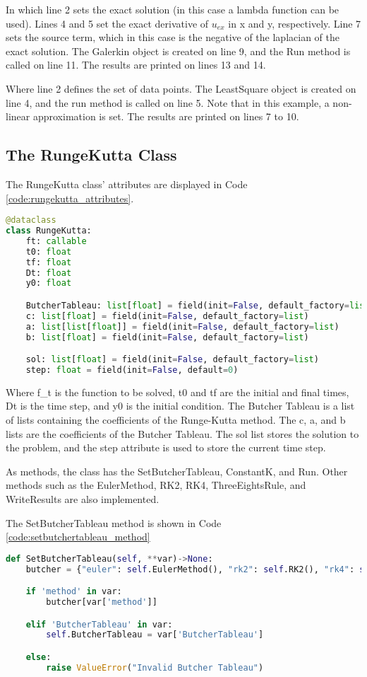 In which line 2 sets the exact solution (in this case a lambda function can be used). Lines 4 and 5 set the exact derivative of $u_{ex}$ in x and y, respectively. Line 7 sets the source term, which in this case is the negative of the laplacian of the exact solution. The Galerkin object is created on line 9, and the Run method is called on line 11. The results are printed on lines 13 and 14.

Where line 2 defines the set of data points. The LeastSquare object is created on line 4, and the run method is called on line 5. Note that in this example, a non-linear approximation is set. The results are printed on lines 7 to 10.

\subsection{The RungeKutta Class}\label{subsec:rungekutta_class}
The RungeKutta class' attributes are displayed in Code \ref{code:rungekutta_attributes}. 
\begin{lstlisting}[caption={Attributes of the RungeKutta class},label={code:rungekutta_attributes},language=python]
@dataclass
class RungeKutta:
    ft: callable
    t0: float
    tf: float
    Dt: float
    y0: float

    ButcherTableau: list[float] = field(init=False, default_factory=list)
    c: list[float] = field(init=False, default_factory=list)
    a: list[list[float]] = field(init=False, default_factory=list)
    b: list[float] = field(init=False, default_factory=list)

    sol: list[float] = field(init=False, default_factory=list)
    step: float = field(init=False, default=0)
\end{lstlisting}

Where f\_t is the function to be solved, t0 and tf are the initial and final times, Dt is the time step, and y0 is the initial condition. The Butcher Tableau is a list of lists containing the coefficients of the Runge-Kutta method. The c, a, and b lists are the coefficients of the Butcher Tableau. The sol list stores the solution to the problem, and the step attribute is used to store the current time step.

As methods, the class has the SetButcherTableau, ConstantK, and Run. Other methods such as the EulerMethod, RK2, RK4, ThreeEightsRule, and WriteResults are also implemented. 

The SetButcherTableau method is shown in Code \ref{code:setbutchertableau_method}
\begin{lstlisting}[caption={SetButcherTableau method},label={code:setbutchertableau_method},language=python]
def SetButcherTableau(self, **var)->None:
    butcher = {"euler": self.EulerMethod(), "rk2": self.RK2(), "rk4": self.RK4(), "ThreeEights": self.ThreeEighthRule()}

    if 'method' in var:
        butcher[var['method']]

    elif 'ButcherTableau' in var:
        self.ButcherTableau = var['ButcherTableau']

    else: 
        raise ValueError("Invalid Butcher Tableau")
\end{lstlisting}

